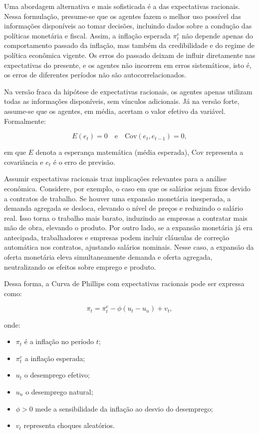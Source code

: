 \documentclass[12pt,oneside]{abntex2}
\begin{document}
Uma abordagem alternativa e mais sofisticada é a das expectativas racionais. Nessa formulação, presume-se que os agentes fazem o melhor uso possível das informações disponíveis ao tomar decisões, incluindo dados sobre a condução das políticas monetária e fiscal. Assim, a inflação esperada $\pi_t^e$ não depende apenas do comportamento passado da inflação, mas também da credibilidade e do regime de política econômica vigente. Os erros do passado deixam de influir diretamente nas expectativas do presente, e os agentes não incorrem em erros sistemáticos, isto é, os erros de diferentes períodos não são autocorrelacionados.

Na versão fraca da hipótese de expectativas racionais, os agentes apenas utilizam todas as informações disponíveis, sem vínculos adicionais. Já na versão forte, assume-se que os agentes, em média, acertam o valor efetivo da variável. Formalmente:

\[
E(e_t) = 0 \quad \text{e} \quad \text{Cov}(e_t, e_{t-1}) = 0,
\]

em que $E$ denota a esperança matemática (média esperada), $\text{Cov}$ representa a covariância e $e_t$ é o erro de previsão.  

Assumir expectativas racionais traz implicações relevantes para a análise econômica. Considere, por exemplo, o caso em que os salários sejam fixos devido a contratos de trabalho. Se houver uma expansão monetária inesperada, a demanda agregada se desloca, elevando o nível de preços e reduzindo o salário real. Isso torna o trabalho mais barato, induzindo as empresas a contratar mais mão de obra, elevando o produto. Por outro lado, se a expansão monetária já era antecipada, trabalhadores e empresas podem incluir cláusulas de correção automática nos contratos, ajustando salários nominais. Nesse caso, a expansão da oferta monetária eleva simultaneamente demanda e oferta agregada, neutralizando os efeitos sobre emprego e produto.

Dessa forma, a Curva de Phillips com expectativas racionais pode ser expressa como:

\[
\pi_t = \pi_t^e - \phi (u_t - u_n) + v_t,
\]

onde:
\begin{itemize}
    \item $\pi_t$ é a inflação no período $t$;
    \item $\pi_t^e$ a inflação esperada;
    \item $u_t$ o desemprego efetivo;
    \item $u_n$ o desemprego natural;
    \item $\phi > 0$ mede a sensibilidade da inflação ao desvio do desemprego; 
    \item $v_t$ representa choques aleatórios.  
\end{itemize}
\end{document}
